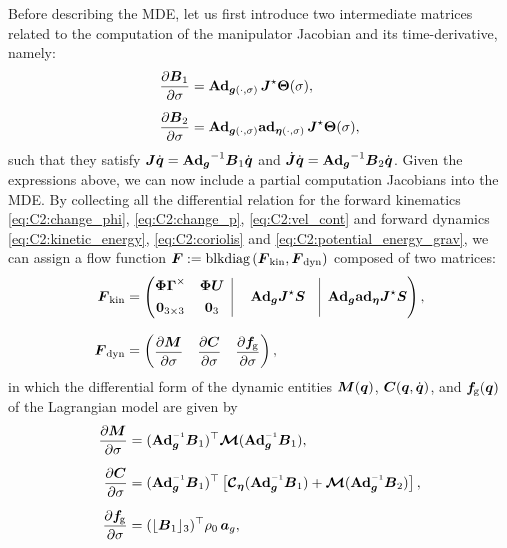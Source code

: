 Before describing the MDE, let us first introduce two intermediate matrices related to the computation of the manipulator Jacobian and its time-derivative, namely:
%
\begin{align}
\frac{\partial \boldsymbol{B}_1}{\partial \sigma} &= \textbf{Ad}_{{\boldsymbol{g}}(\cdot,\sigma)}\, \boldsymbol{J}^\star \boldsymbol{\Theta}(\sigma), \\[0.5em]
\frac{\partial \boldsymbol{B}_2}{\partial \sigma} &= \textbf{Ad}_{{\boldsymbol{g}}(\cdot,\sigma)}\textbf{ad}_{{\boldsymbol{\eta}}(\cdot,\sigma)}\, \boldsymbol{J}^\star {\boldsymbol{\Theta}}(\sigma),
\end{align}
%
such that they satisfy $\boldsymbol{J} {\dot{\boldsymbol{q}}} = {\textbf{Ad}_{\boldsymbol{g}}}^{-1} \boldsymbol{B}_1 {\dot{\boldsymbol{q}}}$ and $\,\dot{\!\boldsymbol{J}} {\dot{\boldsymbol{q}}} = {\textbf{Ad}_{\boldsymbol{g}}}^{-1} \boldsymbol{B}_2 {\dot{\boldsymbol{q}}}$.
Given the expressions above, we can now include a partial computation Jacobians into the MDE. By collecting all the differential relation for the forward kinematics \eqref{eq:C2:change_phi}, \eqref{eq:C2:change_p}, \eqref{eq:C2:vel_cont} and forward dynamics \eqref{eq:C2:kinetic_energy}, \eqref{eq:C2:coriolis} and
\eqref{eq:C2:potential_energy_grav}, we can assign a flow function
$\boldsymbol{F}:= \text{blkdiag}\left(\boldsymbol{F}_\textrm{kin},\boldsymbol{F}_\textrm{dyn} \right)$
composed of two matrices:
%
\begin{align}
\mat{F}_\textrm{kin} & = \begin{pmatrix}
\begin{matrix} \PhiB \vec{\Gamma}^\times & \PhiB \vec{U} \\[0.35em] \vec{0}_{3\times3} & \vec{0}_3 \end{matrix}
\;\; \vrule\; & \Ad_{\gB} \JB^\star\mat{S} &\vrule\;\; \Ad_{\gB} \ad_{\etaB} \JB^\star \mat{S}
\end{pmatrix}, \\[0.75em]
\mat{F}_\textrm{dyn} & = \begin{pmatrix}
\dfrac{\p \mat{M}}{\p \sigma} & \dfrac{\p \mat{C}}{\p \sigma} & \dfrac{\p \vec{f}\!\grav}{\p \sigma} \end{pmatrix},
\end{align}
in which the differential form of the dynamic entities $\boldsymbol{M}({\boldsymbol{q}})$, $\boldsymbol{C}({\boldsymbol{q}},{\dot{\boldsymbol{q}}})$, and $\boldsymbol{f}\!_{\scriptstyle\textrm{g}}({\boldsymbol{q}})$ of the Lagrangian model are given by
%
\begin{align}
\dfrac{\p \mat{M}}{\p \sigma} & = (\Ad_{\gB}\inv \mat{B}_1)^\top \ten{M} (\Ad_{\gB}\inv \mat{B}_1), \\[0.6em]
\dfrac{\p \mat{C}}{\p \sigma} & = (\Ad_{\gB}\inv \mat{B}_1)^\top \left[\ten{C}_\etaB (\Ad_{\gB}\inv \mat{B}_1) + \ten{M} (\Ad_{\gB}\inv \mat{B}_2) \right], \\[0.6em]
\dfrac{\p \vec{f}\!\grav}{\p \sigma} & = (\floor{\mat{B}_{1}}_3)^\top \rho_0\, \vec{a}_g,
\end{align}

